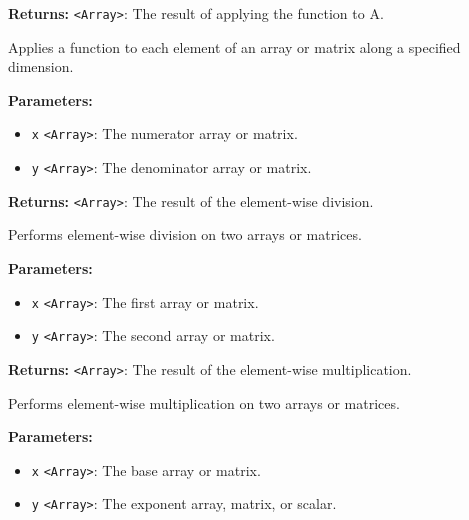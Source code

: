 \documentclass[12pt,a4paper]{article}
\begin{document}
\noindent \textbf{Returns:} \texttt{<Array>}: The result of applying the function to A.

\noindent Applies a function to each element of an array or matrix along a specified dimension.

\vspace{5mm}
\noindent {}


\noindent \textbf{Parameters:}
\begin{itemize}
  \item \texttt{x} \texttt{<Array>}: The numerator array or matrix.
  \item \texttt{y} \texttt{<Array>}: The denominator array or matrix.
\end{itemize}

\noindent \textbf{Returns:} \texttt{<Array>}: The result of the element-wise division.

\noindent Performs element-wise division on two arrays or matrices.

\vspace{5mm}
\noindent {}


\noindent \textbf{Parameters:}
\begin{itemize}
  \item \texttt{x} \texttt{<Array>}: The first array or matrix.
  \item \texttt{y} \texttt{<Array>}: The second array or matrix.
\end{itemize}

\noindent \textbf{Returns:} \texttt{<Array>}: The result of the element-wise multiplication.

\noindent Performs element-wise multiplication on two arrays or matrices.

\vspace{5mm}
\noindent {}


\noindent \textbf{Parameters:}
\begin{itemize}
  \item \texttt{x} \texttt{<Array>}: The base array or matrix.
  \item \texttt{y} \texttt{<Array>}: The exponent array, matrix, or scalar.
\end{itemize}
\end{document}
